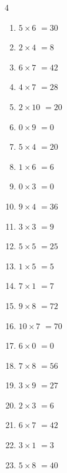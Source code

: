 \begin{multicols}{4}
\begin{enumerate}
  \item $5\times 6$
        $=30$

\columnbreak %

  \item $2\times 4$
        $=8$

  \item $6\times 7$
        $=42$

  \item $4\times 7$
        $=28$

  \item $2\times 10$
        $=20$

  \item $0\times 9$
        $=0$

  \item $5\times 4$
        $=20$

  \item $1\times 6$
        $=6$

  \item $0\times 3$
        $=0$

  \item $9\times 4$
        $=36$

  \item $3\times 3$
        $=9$

  \item $5\times 5$
        $=25$

  \item $1\times 5$
        $=5$

  \item $7\times 1$
        $=7$

  \item $9\times 8$
        $=72$

  \item $10\times 7$
        $=70$

  \item $6\times 0$
        $=0$

  \item $7\times 8$
        $=56$

  \item $3\times 9$
        $=27$

  \item $2\times 3$
        $=6$

  \item $6\times 7$
        $=42$

  \item $3\times 1$
        $=3$

  \item $5\times 8$
        $=40$


\end{enumerate}
\end{multicols}
